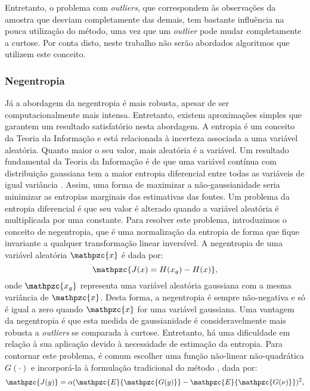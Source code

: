     \bigskip

    Entretanto, o problema com \textit{outliers}, que correspondem às observações da amostra que desviam completamente das demais, tem bastante influência na pouca utilização do método, uma vez que um \textit{outlier} pode mudar completamente a curtose. Por conta disto, neste trabalho não serão abordados algoritmos que utilizem este conceito.
    
\subsubsection{Negentropia} \label{sec:negentropy}

    Já a abordagem da negentropia é mais robusta, apesar de ser computacionalmente mais intensa. Entretanto, existem aproximações simples que garantem um resultado satisfatório nesta abordagem. A entropia é um conceito da Teoria da Informação e está relacionada à incerteza associada a uma variável aleatória. Quanto maior o seu valor, mais aleatória é a variável. Um resultado fundamental da Teoria da Informação é de que uma variável contínua com distribuição gaussiana tem a maior entropia diferencial entre todas as variáveis de igual variância \cite{entropy}. Assim, uma forma de maximizar a não-gaussianidade seria minimizar as entropias marginais das estimativas das fontes. Um problema da entropia diferencial é que seu valor é alterado quando a variável aleatória é multiplicada por uma constante. Para resolver este problema, introduzimos o conceito de negentropia, que é uma normalização da entropia de forma que fique invariante a qualquer transformação linear inversível. A negentropia de uma variável aleatória $\mathpzc{x}$ é dada por:
    \begin{equation}
        \mathpzc{J(x) = H(x_g) - H(x)},
    \end{equation}
    onde $\mathpzc{x_g}$ representa uma variável aleatória gaussiana com a mesma variância de $\mathpzc{x}$. Desta forma, a negentropia é sempre não-negativa e só é igual a zero quando $\mathpzc{x}$ for uma variável gaussiana. Uma vantagem da negentropia é que esta medida de gaussianidade é consideravelmente mais robusta a \textit{outliers} se comparada à curtose.
    Entretanto, há uma dificuldade em relação à sua aplicação devido à necessidade de estimação da entropia. Para contornar este problema, é comum escolher uma função não-linear não-quadrática $G(\cdot)$ e incorporá-la à formulação tradicional do método \cite{fastica1}, dada por:
    \begin{equation}
        \mathpzc{J(y)} = \alpha(\mathpzc{E}\{\mathpzc{G(y)}\} - \mathpzc{E}\{\mathpzc{G(\nu)}\})^2,
    \end{equation}
